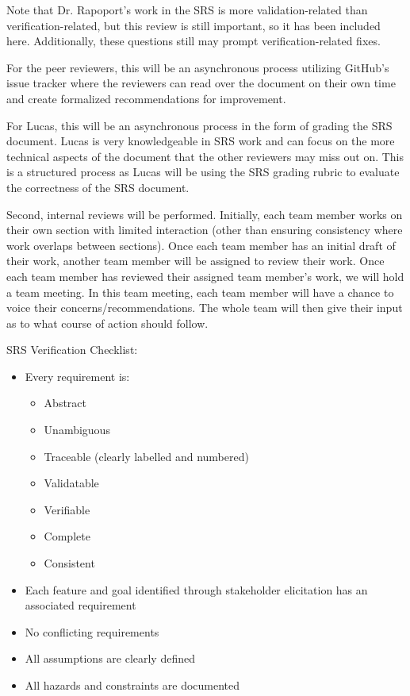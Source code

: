 \documentclass[12pt, titlepage]{article}
\begin{document}
Note that Dr. Rapoport's work in the SRS is more validation-related than verification-related, but this review is still important, so it has been included here. Additionally, these questions still may prompt verification-related fixes.

For the peer reviewers, this will be an asynchronous process utilizing GitHub's issue tracker where the reviewers can read over the document on their own time and create formalized recommendations for improvement.

For Lucas, this will be an asynchronous process in the form of grading the SRS document. Lucas is very knowledgeable in SRS work and can focus on the more technical aspects of the document that the other reviewers may miss out on. This is a structured process as Lucas will be using the SRS grading rubric to evaluate the correctness of the SRS document.

Second, internal reviews will be performed. Initially, each team member works on their own section with limited interaction (other than ensuring consistency where work overlaps between sections). Once each team member has an initial draft of their work, another team member will be assigned to review their work. Once each team member has reviewed their assigned team member's work, we will hold a team meeting. In this team meeting, each team member will have a chance to voice their concerns/recommendations. The whole team will then give their input as to what course of action should follow.

SRS Verification Checklist:

\begin{itemize}
  \item Every requirement is:
  \begin{itemize}
    \item Abstract
    \item Unambiguous
    \item Traceable (clearly labelled and numbered)
    \item Validatable
    \item Verifiable
    \item Complete
    \item Consistent
  \end{itemize}
  \item Each feature and goal identified through stakeholder elicitation has an associated requirement
  \item No conflicting requirements
  \item All assumptions are clearly defined
  \item All hazards and constraints are documented
\end{itemize}
\end{document}
